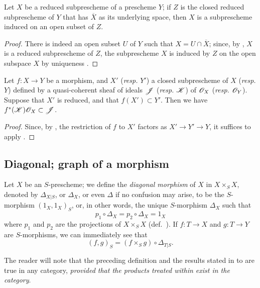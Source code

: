 \begin{prop}[5.2.2]
\label{1.5.2.2}
Let $X$ be a reduced subprescheme of a prescheme $Y$; if $Z$ is the closed reduced subprescheme of $Y$ that has $\overline{X}$ as its underlying space, then $X$ is a subprescheme induced on an open subset of $Z$.
\end{prop}

\begin{proof}
\label{proof-1.5.2.2}
There is indeed an open subset $U$ of $Y$ such that $X=U\cap\overline{X}$;
since, by , $X$ is a reduced subprescheme of $Z$, the subprescheme $X$ is induced by $Z$ on the open subspace $X$ by uniqueness .
\end{proof}

\begin{cor}[5.2.4]
\label{1.5.2.4}
Let $f:X\to Y$ be a morphism, and $X'$ (\emph{resp.} $Y'$) a closed subprescheme of $X$ (\emph{resp.} $Y$) defined by a quasi-coherent sheaf of ideals $\mathscr{J}$ (\emph{resp.} $\mathscr{K}$) of $\mathscr{O}_X$ (\emph{resp.} $\mathscr{O}_Y$).
Suppose that $X'$ is reduced, and that $f(X')\subset Y'$.
Then we have $f^*(\mathscr{K})\mathscr{O}_X\subset\mathscr{J}$.
\end{cor}

\begin{proof}
\label{proof-1.5.2.4}
Since, by , the restriction of $f$ to $X'$ factors as $X'\to Y'\to Y$, it suffices to apply .
\end{proof}

\subsection{Diagonal; graph of a morphism}
\label{subsection:diagonal-graph-of-a-morphism}

\begin{env}[5.3.1]
\label{1.5.3.1}
Let $X$ be an $S$-prescheme;
we define the \emph{diagonal morphism} of $X$ in $X\times_S X$, denoted by $\Delta_{X|S}$, or $\Delta_X$, or even $\Delta$ if no confusion may arise, to be the $S$-morphism $(1_X,1_X)_S$, or, in other words, the unique $S$-morphism $\Delta_X$ such that
\[
    p_1\circ\Delta_X=p_2\circ\Delta_X=1_X\tag{5.3.1.1}
\]
where $p_1$ and $p_2$ are the projections of $X\times_S X$ (def.~).
If $f:T\to X$ and $g:T\to Y$ are $S$-morphisms, we can immediately see that
\[
    (f,g)_S=(f\times_S g)\circ\Delta_{T|S}.\tag{5.3.1.2}
\]

The reader will note that the preceding definition and the results stated in  to  are true in any category, \emph{provided that the products treated within exist in the category}.
\end{env}

